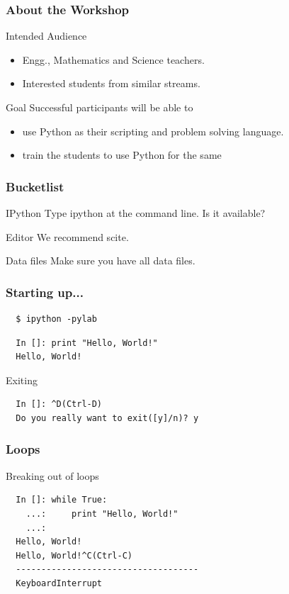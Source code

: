 \documentclass[14pt,compress]{beamer}
\begin{document}
\begin{frame}
  \frametitle{About the Workshop}
  \begin{block}{Intended Audience}
  \begin{itemize}
       \item Engg., Mathematics and Science teachers.
       \item Interested students from similar streams.
  \end{itemize}
  \end{block}  

  \begin{block}{Goal}
	Successful participants will be able to 
        \begin{itemize}
          \item use Python as their scripting and problem solving language. 
          \item train the students to use Python for the same
        \end{itemize}
  \end{block}
\end{frame}


\begin{frame}
\frametitle{Bucketlist}  
  \begin{block}{IPython}
    Type ipython at the command line. Is it available?
  \end{block}
  \begin{block}{Editor}
    We recommend scite.
  \end{block}
  \begin{block}{Data files}
    Make sure you have all data files.
  \end{block}
\end{frame}

\begin{frame}[fragile]
\frametitle{Starting up...}
\begin{block}{}
\begin{verbatim}
  $ ipython -pylab  
\end{verbatim}
\end{block}
\begin{lstlisting}     
  In []: print "Hello, World!"
  Hello, World!
\end{lstlisting}
Exiting
\begin{lstlisting}     
  In []: ^D(Ctrl-D)
  Do you really want to exit([y]/n)? y
\end{lstlisting}
\end{frame}

\begin{frame}[fragile]
\frametitle{Loops}
Breaking out of loops
\begin{lstlisting}     
  In []: while True:
    ...:     print "Hello, World!"
    ...:     
  Hello, World!
  Hello, World!^C(Ctrl-C)
  ------------------------------------
  KeyboardInterrupt                   

\end{lstlisting}
\end{frame}
\end{document}
